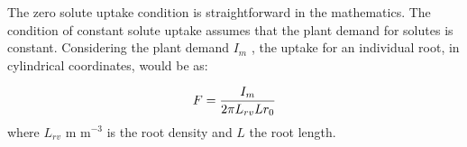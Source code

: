 The zero solute uptake condition is straightforward in the mathematics. 
The condition of constant solute uptake assumes that the plant demand for solutes is constant. Considering the plant demand $I_m$ \usolflux, the uptake for an individual root, in cylindrical coordinates, would be as:

$$
F = {I_m \over 2 \pi L_{rv} L r_0}
$$
%
where $L_{rv}$ m m$^{-3}$ is the root density and $L$ \uhead the root length.



